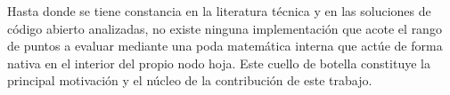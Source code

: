 Hasta donde se tiene constancia en la literatura técnica y en las soluciones de código abierto analizadas, no existe ninguna implementación que acote el rango de puntos a evaluar mediante una poda matemática interna que actúe de forma nativa en el interior del propio nodo hoja. Este cuello de botella constituye la principal motivación y el núcleo de la contribución de este trabajo.




